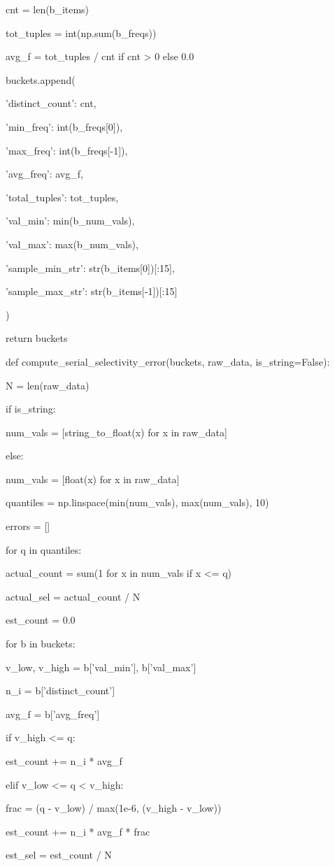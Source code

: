 \documentclass[11pt,a4paper]{article}
\begin{document}
cnt = len(b\_items)

tot\_tuples = int(np.sum(b\_freqs))

avg\_f = tot\_tuples / cnt if cnt > 0 else 0.0


buckets.append({

'distinct\_count': cnt,

'min\_freq': int(b\_freqs[0]),

'max\_freq': int(b\_freqs[-1]),

'avg\_freq': avg\_f,

'total\_tuples': tot\_tuples,

'val\_min': min(b\_num\_vals),

'val\_max': max(b\_num\_vals),

'sample\_min\_str': str(b\_items[0])[:15],

'sample\_max\_str': str(b\_items[-1])[:15]

})

return buckets


def compute\_serial\_selectivity\_error(buckets, raw\_data, is\_string=False):

N = len(raw\_data)

if is\_string:

num\_vals = [string\_to\_float(x) for x in raw\_data]

else:

num\_vals = [float(x) for x in raw\_data]


quantiles = np.linspace(min(num\_vals), max(num\_vals), 10)

errors = []


for q in quantiles:

actual\_count = sum(1 for x in num\_vals if x <= q)

actual\_sel = actual\_count / N


est\_count = 0.0

for b in buckets:

v\_low, v\_high = b['val\_min'], b['val\_max']

n\_i = b['distinct\_count']

avg\_f = b['avg\_freq']


if v\_high <= q:

est\_count += n\_i * avg\_f

elif v\_low <= q < v\_high:

frac = (q - v\_low) / max(1e-6, (v\_high - v\_low))

est\_count += n\_i * avg\_f * frac


est\_sel = est\_count / N
\end{document}

